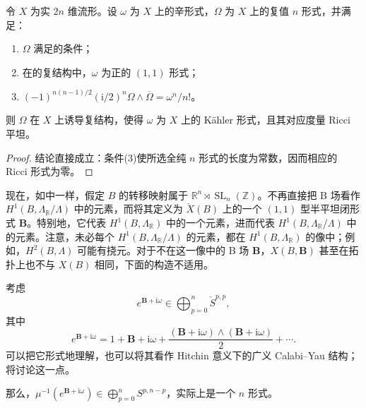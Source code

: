 \begin{proposition}\label{prop:6.25}
令 $X$ 为实 $2n$ 维流形。设 $\omega$ 为 $X$ 上的辛形式，$\Omega$ 为 $X$ 上的复值 $n$ 形式，并满足：
\begin{enumerate}[label=(\arabic*)]
\item $\Omega$ 满足的条件；
\item 在的复结构中，$\omega$ 为正的 $(1,1)$ 形式；
\item $(-1)^{n(n-1)/2}(\mathrm i/2)^n\Omega\wedge\overline\Omega=\omega^n/n!$。
\end{enumerate}
则 $\Omega$ 在 $X$ 上诱导复结构，使得 $\omega$ 为 $X$ 上的 Kähler 形式，且其对应度量 Ricci 平坦。
\end{proposition}
\begin{proof}
结论直接成立：条件(3)使所选全纯 $n$ 形式的长度为常数，因而相应的 Ricci 形式为零。
\end{proof}

现在，如中一样，假定 $B$ 的转移映射属于 $\mathbb R^n\rtimes\operatorname{SL}_n(\mathbb Z)$。不再直接把 B 场看作 $H^1(B,\Lambda_{\mathbb R}/\Lambda)$ 中的元素，而将其定义为 $\check X(B)$ 上的一个 $(1,1)$ 型半平坦闭形式 $\mathbf B$。特别地，它代表 $H^1(B,\Lambda_{\mathbb R})$ 中的一个元素，进而代表 $H^1(B,\Lambda_{\mathbb R}/\Lambda)$ 中的元素。注意，未必每个 $H^1(B,\Lambda_{\mathbb R}/\Lambda)$ 的元素，都在 $H^1(B,\Lambda_{\mathbb R})$ 的像中；例如，$H^2(B,\Lambda)$ 可能有挠元。对于不在这一像中的 B 场 $\mathbf B$，$X(B,\mathbf B)$ 甚至在拓扑上也不与 $X(B)$ 相同，下面的构造不适用。

考虑
\[
e^{\mathbf B+\mathrm i\omega}\in\bigoplus_{p=0}^n\check S^{p,p},
\]
其中
\[
e^{\mathbf B+\mathrm i\omega}
=1+\mathbf B+\mathrm i\omega
+\frac{(\mathbf B+\mathrm i\omega)\wedge(\mathbf B+\mathrm i\omega)}{2}+\cdots.
\]
可以把它形式地理解，也可以将其看作 Hitchin 意义下的广义 Calabi--Yau 结构；将讨论这一点。

那么，$\mu^{-1}(e^{\mathbf B+\mathrm i\omega})\in\bigoplus_{p=0}^nS^{p,n-p}$，实际上是一个 $n$ 形式。

